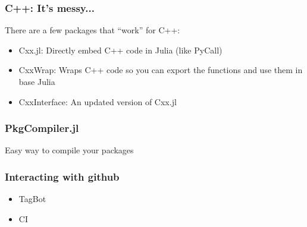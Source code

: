 \documentclass{beamer}
\begin{document}
\begin{frame}[fragile]
\frametitle{C++: It's messy...}

There are a few packages that ``work'' for C++:
\begin{itemize}
\item Cxx.jl: Directly embed C++ code in Julia (like PyCall)
\item CxxWrap: Wraps C++ code so you can export the functions and use them in base Julia
\item CxxInterface: An updated version of Cxx.jl
\end{itemize}
\end{frame}

\begin{frame}
\frametitle{PkgCompiler.jl}
Easy way to compile your packages
\end{frame}

\begin{frame}
\frametitle{Interacting with github}
\begin{itemize}
\item TagBot
\item CI
\end{itemize}
\end{frame}
\end{document}
